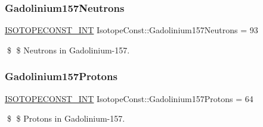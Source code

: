 \subsubsection{\texorpdfstring{Gadolinium157\+Neutrons}{Gadolinium157Neutrons}}
{\footnotesize\ttfamily \mbox{\hyperlink{group___isotope_const-_macros_ga5f18360b3e99483a35c32d789e62621c}{I\+S\+O\+T\+O\+P\+E\+C\+O\+N\+S\+T\+\_\+\+I\+NT}} Isotope\+Const\+::\+Gadolinium157\+Neutrons = 93}

\$ \$ Neutrons in Gadolinium-\/157. \mbox{\label{group___isotope_const-_gadolinium-_gd157_ga76d18e35a712dbc0ef69dfeab9833adb}} 
\subsubsection{\texorpdfstring{Gadolinium157\+Protons}{Gadolinium157Protons}}
{\footnotesize\ttfamily \mbox{\hyperlink{group___isotope_const-_macros_ga5f18360b3e99483a35c32d789e62621c}{I\+S\+O\+T\+O\+P\+E\+C\+O\+N\+S\+T\+\_\+\+I\+NT}} Isotope\+Const\+::\+Gadolinium157\+Protons = 64}

\$ \$ Protons in Gadolinium-\/157. 